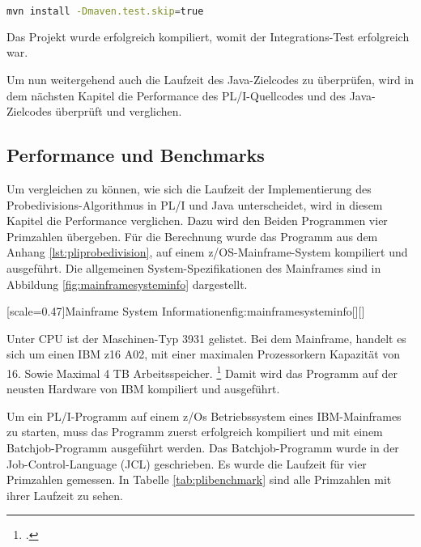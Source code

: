 \begin{lstlisting}[language=Bash, caption=Kompilieren des Projekts, label={lst:inttest6}]
mvn install -Dmaven.test.skip=true
\end{lstlisting}

Das Projekt wurde erfolgreich kompiliert, womit der Integrations-Test erfolgreich war.

Um nun weitergehend auch die Laufzeit des Java-Zielcodes zu überprüfen,
wird in dem nächsten Kapitel die Performance des PL/I-Quellcodes und des Java-Zielcodes überprüft und verglichen. 
\pagebreak


\subsection{Performance und Benchmarks}
Um vergleichen zu können, wie sich die Laufzeit der Implementierung des Probedivisions-Algorithmus in PL/I und Java unterscheidet, wird in diesem Kapitel die Performance verglichen. 
Dazu wird den Beiden Programmen vier Primzahlen übergeben.
Für die Berechnung wurde das Programm aus dem Anhang \ref{lst:pliprobedivision}, auf einem z/OS-Mainframe-System kompiliert und ausgeführt. 
Die allgemeinen System-Spezifikationen des Mainframes sind in Abbildung \ref{fig:mainframesysteminfo} dargestellt.

[scale=0.47]{Mainframe System Informationen}{fig:mainframesysteminfo}[][]

Unter CPU ist der Maschinen-Typ 3931 gelistet. Bei dem Mainframe, handelt es sich um einen IBM z16 A02, mit
einer maximalen Prozessorkern Kapazität von 16. Sowie Maximal 4 TB Arbeitsspeicher. \footcite{z16}
Damit wird das Programm auf der neusten Hardware von IBM kompiliert und ausgeführt.

Um ein PL/I-Programm auf einem z/Os Betriebssystem eines IBM-Mainframes zu starten, muss das Programm zuerst erfolgreich kompiliert und mit einem Batchjob-Programm
ausgeführt werden. Das Batchjob-Programm wurde in der Job-Control-Language (JCL) geschrieben.
Es wurde die Laufzeit für vier Primzahlen gemessen. In Tabelle \ref{tab:plibenchmark} sind alle Primzahlen mit ihrer Laufzeit zu sehen.

